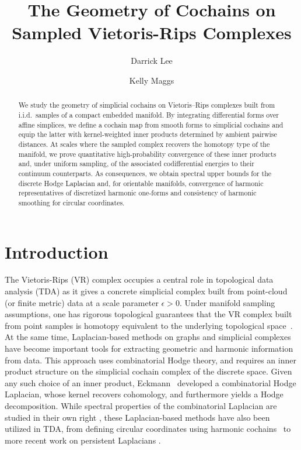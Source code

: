 \documentclass[11pt,reqno]{amsproc}
\title{The Geometry of  Cochains on Sampled Vietoris-Rips Complexes}
\author{Darrick Lee}
\author{Kelly Maggs}
\numberwithin{equation}{section}
\theoremstyle{definition}
\theoremstyle{plain}
\begin{document}
\begin{abstract}
We study the geometry of simplicial cochains on Vietoris--Rips complexes built from i.i.d.\ samples of a compact embedded manifold. By integrating differential forms over affine simplices, we define a cochain map from smooth forms to simplicial cochains and equip the latter with kernel-weighted inner products determined by ambient pairwise distances. At scales where the sampled complex recovers the homotopy type of the manifold, we prove quantitative high-probability convergence of these inner products and, under uniform sampling, of the associated codifferential energies to their continuum counterparts. As consequences, we obtain spectral upper bounds for the discrete Hodge Laplacian and, for orientable manifolds, convergence of harmonic representatives of discretized harmonic one-forms and consistency of harmonic smoothing for circular coordinates.
\end{abstract}

\maketitle

{\footnotesize
\tableofcontents
}

\section{Introduction}


The Vietoris-Rips (VR) complex occupies a central role in topological data analysis (TDA) as it gives a concrete simplicial complex built from point-cloud (or finite metric) data at a scale parameter $\epsilon > 0$. Under manifold sampling assumptions, one has rigorous topological guarantees that the VR complex built from point samples is homotopy equivalent to the underlying topological space~\cite{hausmann1995vietorisrips,latschev_vietoris-rips_2001,majhi_demystifying_2024}. At the same time, Laplacian-based methods on graphs and simplicial complexes have become important tools for extracting geometric and harmonic information from data. This approach uses combinatorial Hodge theory, and requires an inner product structure on the simplicial cochain complex of the discrete space. Given any such choice of an inner product, Eckmann~\cite{Eckmann1944} developed a combinatorial Hodge Laplacian, whose kernel recovers cohomology, and furthermore yields a Hodge decomposition. While spectral properties of the combinatorial Laplacian are studied in their own right \cite{horak_spectra_2013, Lim-2020}, these Laplacian-based methods have also been utilized in TDA, from defining circular coordinates using harmonic cochains~\cite{deSilva2011} to more recent work on persistent Laplacians \cite{guo-wei-2020,memoli-2022, Chen2022}.
\end{document}
